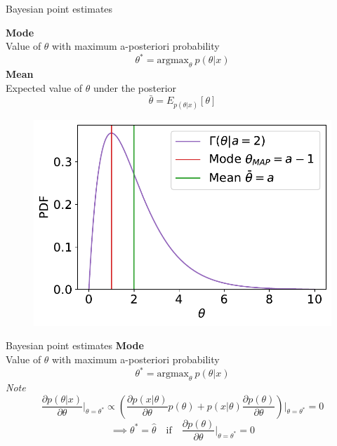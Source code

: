 \documentclass[
aspectratio=169,
14pt,
professionalfonts
]{beamer}
\begin{document}
\begin{frame}{Bayesian point estimates}
    \begin{minipage}{0.49\textwidth}
        \textbf{Mode}\\ Value of $\theta$ with maximum a-posteriori probability
            $$\theta^* = \text{argmax}_\theta ~ p(\theta|x)$$
        \textbf{Mean}\\ Expected value of $\theta$ under the posterior
            $$ \bar{\theta} = E_{p(\theta|x)}[\theta]$$
    \end{minipage}
    \begin{minipage}{0.49\textwidth}
        \begin{figure}
            \centering
            \includegraphics[width=\linewidth]{../plots/map_vs_mean.pdf}
        \end{figure}
    \end{minipage}
\end{frame}

\begin{frame}{Bayesian point estimates}
        \textbf{Mode}\\ Value of $\theta$ with maximum a-posteriori probability
            $$\theta^* = \text{argmax}_\theta ~ p(\theta|x)$$
        \textit{Note}
        $$\frac{\partial p(\theta|x)}{\partial \theta}\bigg\vert_{\theta = \theta^*} \propto 
        \left(
            \frac{\partial p(x|\theta)}{\partial \theta}p(\theta) + p(x|\theta) \frac{\partial p(\theta)}{\partial \theta}\right)\bigg\vert_{\theta = \theta^*} = 0$$
        $$\implies \theta^* = \hat \theta \quad \textrm{if} \quad \frac{\partial p(\theta)}{\partial \theta}\bigg\vert_{\theta = \theta^*}=0$$
\end{frame}
\end{document}
